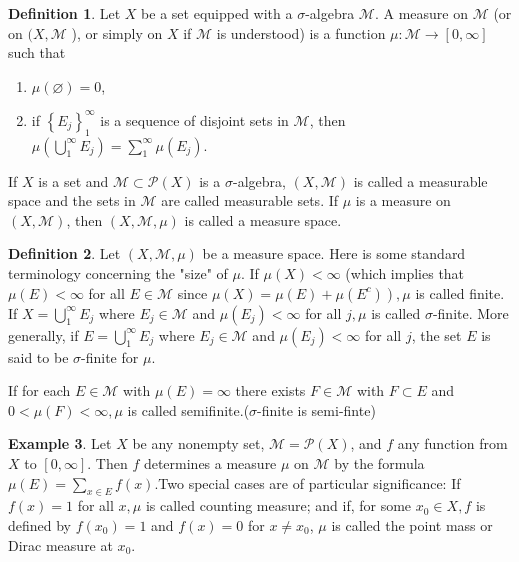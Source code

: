 \documentclass[12pt,a4paper]{book}
\newenvironment{enu}{\begin{enumerate}[(1)]}{\end{enumerate}}
\theoremstyle{definition}
\newtheorem{defn}{Definition}[section]
\newtheorem{exam}[defn]{Example}
\begin{document}
\begin{defn}
    Let $X$ be a set equipped with a $\sigma$-algebra $\mathcal{M}$. A measure on $\mathcal{M}$ (or on $(X, \mathcal{M}$ ), or simply on $X$ if $\mathcal{M}$ is understood) is a function $\mu: \mathcal{M} \rightarrow[0, \infty]$ such that
    \begin{enu}
        \item $\mu(\varnothing)=0$,
        \item if $\left\{E_j\right\}_1^{\infty}$ is a sequence of disjoint sets in $\mathcal{M}$, then $\mu\left(\bigcup_1^{\infty} E_j\right)=\sum_1^{\infty} \mu\left(E_j\right)$.
    \end{enu}
    If $X$ is a set and $\mathcal{M} \subset \mathcal{P}(X)$ is a $\sigma$-algebra, $(X, \mathcal{M})$ is called a measurable space and the sets in $\mathcal{M}$ are called measurable sets. If $\mu$ is a measure on $(X, \mathcal{M})$, then $(X, \mathcal{M}, \mu)$ is called a measure space.
\end{defn}
\begin{defn}
    Let $(X, \mathcal{M}, \mu)$ be a measure space.
    Here is some standard terminology concerning the "size" of $\mu$. If $\mu(X)<\infty$ (which implies that $\mu(E)<\infty$ for all $E \in \mathcal{M}$ since $\left.\mu(X)=\mu(E)+\mu\left(E^c\right)\right), \mu$ is called finite.
    If $X=\bigcup_1^{\infty} E_j$ where $E_j \in \mathcal{M}$ and $\mu\left(E_j\right)<\infty$ for all $j, \mu$ is called $\sigma$-finite. More generally, if $E=\bigcup_1^{\infty} E_j$ where $E_j \in \mathcal{M}$ and $\mu\left(E_j\right)<\infty$ for all $j$, the set $E$ is said to be $\sigma$-finite for $\mu$.

    If for each $E \in \mathcal{M}$ with $\mu(E)=\infty$ there exists $F \in \mathcal{M}$ with $F \subset E$ and $0<\mu(F)<\infty, \mu$ is called semifinite.($\sigma$-finite is semi-finte)
\end{defn}
\begin{exam}
    Let $X$ be any nonempty set, $\mathcal{M}=\mathcal{P}(X)$, and $f$ any function from $X$ to $[0, \infty]$. Then $f$ determines a measure $\mu$ on $\mathcal{M}$ by the formula $\mu(E)=\sum_{x \in E} f(x)$.Two special cases are of particular significance: If $f(x)=1$ for all $x, \mu$ is called counting measure; and if, for some $x_0 \in X, f$ is defined by $f\left(x_0\right)=1$ and $f(x)=0$ for $x \neq x_0$, $\mu$ is called the point mass or Dirac measure at $x_0$.
\end{exam}
\end{document}
